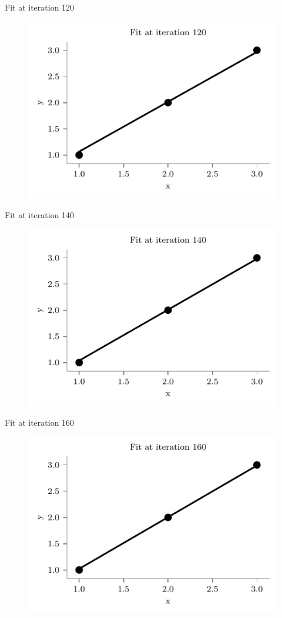 \documentclass{beamer}
\begin{document}
\begin{frame}{Fit at iteration 120}
\begin{figure}
	\centering
	\includegraphics[width=0.7\linewidth]{gradient-descent/fit-iteration-120.pdf}
\end{figure}
\end{frame}

\begin{frame}{Fit at iteration 140}
\begin{figure}
	\centering
	\includegraphics[width=0.7\linewidth]{gradient-descent/fit-iteration-140.pdf}
\end{figure}
\end{frame}

\begin{frame}{Fit at iteration 160}
\begin{figure}
	\centering
	\includegraphics[width=0.7\linewidth]{gradient-descent/fit-iteration-160.pdf}
\end{figure}
\end{frame}
\end{document}
